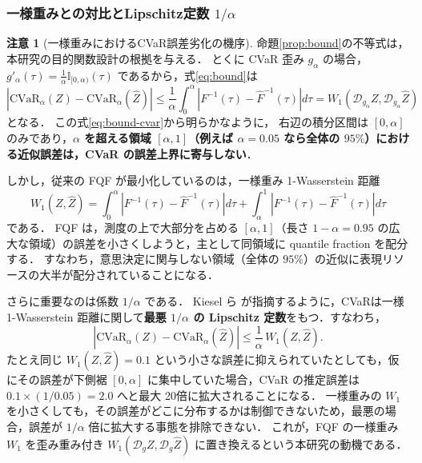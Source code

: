 \documentclass[a4paper,10pt]{jsarticle}
\theoremstyle{definition}
\newtheorem{remark}{注意}[section]
\newcommand{\CVaR}{\mathrm{CVaR}}
\newcommand{\Wone}{W_1}
\renewcommand{\Finv}{F^{-1}}
\newcommand{\Fhinv}{\hat{F}^{-1}}
\newcommand{\dist}{\mathcal{D}_g}
\begin{document}
\subsubsection{一様重みとの対比とLipschitz定数 $1/\alpha$}
\begin{remark}[一様重みにおけるCVaR誤差劣化の機序]
\label{rem:bound-cvar}
命題\ref{prop:bound}の不等式は，本研究の目的関数設計の根拠を与える．
とくに CVaR 歪み $g_\alpha$ の場合，$g'_\alpha(\tau) = \frac{1}{\alpha}\mathbb{I}_{[0, \alpha)}(\tau)$ であるから，式\eqref{eq:bound}は
\begin{equation}
  \left|\CVaR_\alpha(Z) - \CVaR_\alpha(\hat Z)\right| \le \frac{1}{\alpha}\int_0^\alpha \left|\Finv(\tau) - \Fhinv(\tau)\right| d\tau = \Wone(\mathcal{D}_{g_\alpha}Z, \mathcal{D}_{g_\alpha}\hat Z)
  \label{eq:bound-cvar}
\end{equation}
となる．
この式\eqref{eq:bound-cvar}から明らかなように，
右辺の積分区間は $[0, \alpha]$ のみであり，\textbf{$\alpha$ を超える領域 $[\alpha, 1]$（例えば $\alpha=0.05$ なら全体の $95\%$）における近似誤差は，CVaR の誤差上界に寄与しない}．

しかし，従来の FQF が最小化しているのは，一様重み 1-Wasserstein 距離
\begin{equation}
  \Wone(Z, \hat Z) = \int_0^\alpha \left|\Finv(\tau) - \Fhinv(\tau)\right| d\tau + \int_\alpha^1 \left|\Finv(\tau) - \Fhinv(\tau)\right| d\tau
\end{equation}
である．
FQF は，測度の上で大部分を占める $[\alpha, 1]$（長さ $1-\alpha = 0.95$ の広大な領域）の誤差を小さくしようと，主として同領域に quantile fraction を配分する．
すなわち，意思決定に関与しない領域（全体の $95\%$）の近似に表現リソースの大半が配分されていることになる．

さらに重要なのは係数 $1/\alpha$ である．
Kiesel ら \cite{kiesel2016wasserstein} が指摘するように，CVaRは一様 1-Wasserstein 距離に関して\textbf{最悪 $1/\alpha$ の Lipschitz 定数}をもつ．すなわち，
\begin{equation}
  \left|\CVaR_\alpha(Z) - \CVaR_\alpha(\hat Z)\right| \le \frac{1}{\alpha}\,\Wone(Z, \hat Z).
\end{equation}
たとえ同じ $\Wone(Z, \hat Z) = 0.1$ という小さな誤差に抑えられていたとしても，仮にその誤差が下側裾 $[0, \alpha]$ に集中していた場合，CVaR の推定誤差は $0.1 \times (1/0.05) = 2.0$ へと最大 20倍に拡大されることになる．
一様重みの $\Wone$ を小さくしても，その誤差がどこに分布するかは制御できないため，最悪の場合，誤差が $1/\alpha$ 倍に拡大する事態を排除できない．
これが，FQF の一様重み $\Wone$ を歪み重み付き $\Wone(\dist Z, \dist\hat Z)$ に置き換えるという本研究の動機である．
\end{remark}
\end{document}
